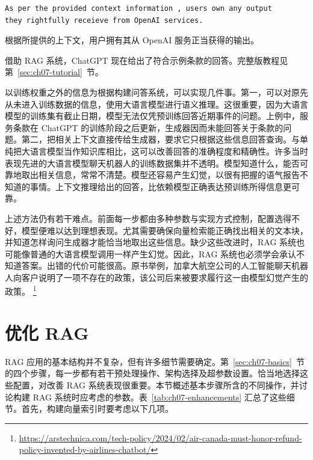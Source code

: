 \begin{lstlisting}[nolol=true]
As per the provided context information , users own any output
they rightfully receieve from OpenAI services.
\end{lstlisting}

根据所提供的上下文，用户拥有其从 OpenAI 服务正当获得的输出。


借助 RAG 系统，ChatGPT 现在给出了符合示例条款的回答。完整版教程见第~\ref{sec:ch07-tutorial}~节。

以训练权重之外的信息为根据构建问答系统，可以实现几件事。第一，可以对原先从未进入训练数据的信息，使用大语言模型进行语义推理。这很重要，因为大语言模型的训练集有截止日期，模型无法仅凭预训练回答近期事件的问题。上例中，服务条款在 ChatGPT 的训练阶段之后更新，生成器因而未能回答关于条款的问题。第二，把相关上下文直接传给生成器，要求它只根据这些信息回答查询。与单纯把大语言模型当作知识库相比，这可以改善回答的准确程度和精确性。许多当时表现先进的大语言模型聊天机器人的训练数据集并不透明。模型知道什么，能否可靠地取出相关信息，常常不清楚。模型还容易产生幻觉，以很有把握的语气报告不知道的事情。上下文推理给出的回答，比依赖模型正确表达预训练所得信息更可靠。

\begin{practicaltip}
上述方法仍有若干难点。前面每一步都由多种参数与实现方式控制，配置选得不好，模型便难以达到理想表现。尤其需要确保向量检索能正确找出相关的文本块，并知道怎样询问生成器才能恰当地取出这些信息。缺少这些改进时，RAG 系统也可能像普通的大语言模型调用一样产生幻觉。因此，RAG 系统也必须学会承认不知道答案。出错的代价可能很高。原书举例，加拿大航空公司的人工智能聊天机器人向客户说明了一项不存在的政策，该公司后来被要求履行这一由模型幻觉产生的政策。%
\footnote{\url{https://arstechnica.com/tech-policy/2024/02/air-canada-must-honor-refund-policy-invented-by-airlines-chatbot/}}
\end{practicaltip}

\section{优化 RAG}
\label{sec:ch07-optimizing}
RAG 应用的基本结构并不复杂，但有许多细节需要确定。第~\ref{sec:ch07-basics}~节的四个步骤，每一步都有若干预处理操作、架构选择及超参数设置。恰当地选择这些配置，对改善 RAG 系统表现很重要。本节概述基本步骤所含的不同操作，并讨论构建 RAG 系统时应考虑的参数。表~\ref{tab:ch07-enhancements} 汇总了这些细节。首先，构建向量索引时要考虑以下几项。

